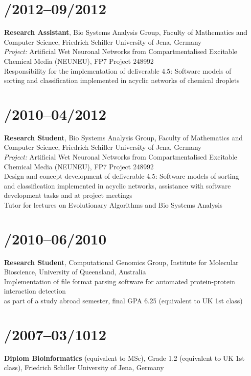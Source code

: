 \documentclass[margin,line,10pt]{res}
\begin{document}
\begin{resume}
\section{/2012--09/2012}{\bf Research Assistant}, Bio Systems Analysis Group, Faculty of Mathematics and Computer Science, Friedrich Schiller University of Jena, Germany\\
{\em Project:} Artificial Wet Neuronal Networks from Compartmentalised Excitable Chemical Media (NEUNEU), FP7 Project 248992\\
Responsibility for the implementation of deliverable 4.5: Software models of sorting and classification implemented in acyclic networks of chemical droplets\\
\vspace*{-.35in}
\section{/2010--04/2012}{\bf Research Student}, Bio Systems Analysis Group, Faculty of Mathematics and Computer Science, Friedrich Schiller University of Jena, Germany\\
{\em Project:} Artificial Wet Neuronal Networks from Compartmentalised Excitable Chemical Media (NEUNEU), FP7 Project 248992\\
Design and concept development of deliverable 4.5: Software models of sorting and classification implemented in acyclic networks, assistance with software development tasks and at project meetings\\
Tutor for lectures on Evolutionary Algorithms and Bio Systems Analysis\\
\vspace*{-.35in}
\section{/2010--06/2010}{\bf Research Student}, Computational Genomics Group, Institute for Molecular Bioscience, University of Queensland, Australia\\
Implementation of file format parsing software for automated protein-protein interaction detection\\
as part of a study abroad semester, final GPA 6.25 (equivalent to UK 1st class)\\
\vspace*{-.35in}
\section{/2007--03/1012}{\bf Diplom Bioinformatics} (equivalent to MSc), Grade 1.2 (equivalent to UK 1st class), Friedrich Schiller University of Jena, Germany\\


\end{resume}
\end{document}
